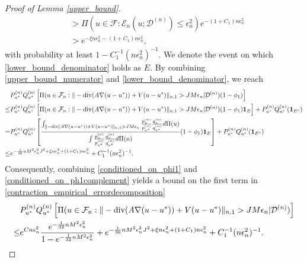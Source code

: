 \documentclass{article}
\newcommand{\F}{\mathcal{F}}
\newcommand{\D}{\mathcal{D}}
\renewcommand{\div}{\textnormal{div}}
\theoremstyle{plain}
\theoremstyle{definition}
\theoremstyle{remark}
\begin{document}
\begin{proof}[Proof of Lemma \ref{upper_bound}]
\begin{equation}
\begin{aligned}
    & > \Pi(u \in \F: \mathcal{E}_n(u; \D^{(n)}) \leq \epsilon_n^2) e^{-(1+C_1) n\epsilon_n^2 } \\
    & > e^{-\xi n\epsilon_n^2 - (1+C_1) n \epsilon_n^2},
    \end{aligned}
\end{equation}
with probability at least $1 - C_1^{-1 } (n\epsilon_n^2)^{-1}$. We denote the event on which \eqref{lower_bound_denominator} holds as $E$. By combining \eqref{upper_bound_numerator} and \eqref{lower_bound_denominator}, we reach
\begin{equation} \label{conditioned_on_ph1complement}
    \begin{aligned}
        & P_{u^*}^{(n)} Q_{u^*}^{(n)} \left[\Pi(u \in \F_n: \|-\div (A \nabla (u - u^*)) + V(u - u^*) \|_{n, 1} >  J M \epsilon_n | \D^{(n)} ) (1 - \phi_1) \right] \\
        \leq & P_{u^*}^{(n)} Q_{u^*}^{(n)} \left[\Pi(u \in \F_n: \|-\div (A \nabla (u - u^*)) + V(u - u^*) \|_{n, 1} >  J M \epsilon_n | \D^{(n)} ) (1 - \phi_1) \mathbf{1}_E  \right] + P_{u^*}^{(n)} Q_{u^*}^{(n)} (\mathbf{1}_{E^c})\\
         = & P_{u^*}^{(n)} Q_{u^*}^{(n)} \left[ \frac{ \int_{\|-\div (A \nabla (u - u^*)) + V(u - u^*) \|_{n, 1} >  J M \epsilon_n} \frac{p_{u}^{(n)}}{p_{u^*}^{(n)}} \frac{q_{u}^{(n)}}{q_{u^*}^{(n)}} d \Pi(u)}{ \int \frac{p_{u}^{(n)}}{p_{u^*}^{(n)}} \frac{q_{u}^{(n)}}{q_{u^*}^{(n)}} d \Pi(u)} (1 - \phi_1) \mathbf{1}_E  \right] + P_{u^*}^{(n)} Q_{u^*}^{(n)} (\mathbf{1}_{E^c}) \\
         \leq &  e^{-\frac{1}{36} n M^2 \epsilon_{n}^2 J^2 + \xi n\epsilon_n^2 + (1+C_1) n \epsilon_n^2} + C_1^{-1} (n\epsilon_n^2)^{-1}. 
    \end{aligned}
\end{equation}
Consequently, combining \eqref{conditioned_on_phi1} and \eqref{conditioned_on_ph1complement} yields a bound on the first term in \eqref{contraction_empirical_errordecomposition}
\begin{equation} \label{first_term}
    \begin{aligned}
        & P_{u^*}^{(n)} Q_{u^*}^{(n)} \left[\Pi(u \in \F_n: \|-\div (A \nabla (u - u^*)) + V(u - u^*) \|_{n, 1} >  J M \epsilon_n | \D^{(n)} ) \right] \\ \leq &  e^{C n \epsilon_n^2} \frac{e^{-\frac{1}{32}n M^2 \epsilon_n^2}}{1 - e^{-\frac{1}{32}n M^2 \epsilon_n^2}} + e^{-\frac{1}{36} n M^2 \epsilon_{n}^2 J^2 + \xi n\epsilon_n^2 + (1+C_1) n \epsilon_n^2} + C_1^{-1} (n\epsilon_n^2)^{-1}.
    \end{aligned}

\end{equation}
\end{proof}
\end{document}
